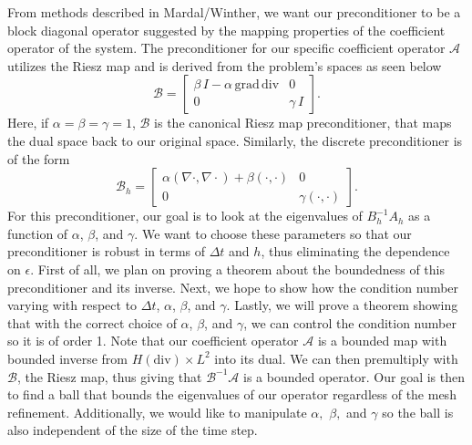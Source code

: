 \documentclass[11pt]{article}
\newcommand{\divv}{\mathrm{div}}
\newcommand{\gradd}{\mathrm{grad}}
\begin{document}
From methods described in Mardal/Winther, we want our preconditioner to be a block diagonal operator suggested by the mapping properties of the coefficient operator of the system. The preconditioner for our specific coefficient operator $\mathscr{A}$ utilizes the Riesz map and is derived from the problem's spaces as seen below
\begin{equation}
\mathscr{B}=\begin{bmatrix}
 \beta\, I -\alpha\,\gradd\,\divv& 0 \\
0 & \gamma\, I
\end{bmatrix}.
\end{equation}
Here, if $\alpha = \beta = \gamma = 1$, $\mathscr{B}$ is the canonical Riesz map preconditioner, that maps the dual space back to our original space. %
Similarly, the discrete preconditioner is of the form
\begin{equation}
\mathscr{B}_h=\begin{bmatrix}
\alpha(\nabla \cdot, \nabla \cdot) + \beta(\cdot,\cdot) & 0 \\
0 & \gamma(\cdot, \cdot)
\end{bmatrix}.
\end{equation}
For this preconditioner, our goal is to look at the eigenvalues of $B_h^{-1}A_h$ as a function of $\alpha$, $\beta$, and $\gamma$. We want to choose these parameters so that our preconditioner is robust in terms of $\Delta t$ and $h$, thus eliminating the dependence on $\epsilon$. First of all, we plan on proving a theorem about the boundedness of this preconditioner and its inverse. Next, we hope to show how the condition number varying with respect to $\Delta t$, $\alpha$, $\beta$, and $\gamma$. Lastly, we will prove a theorem showing that with the correct choice of $\alpha$, $\beta$, and $\gamma$, we can control the condition number so it is of order 1.
Note that our coefficient operator $\mathscr{A}$  is a bounded map with bounded inverse from $H(\divv) \times L^2$ into its dual. We can then premultiply with $\mathscr{B}$, the Riesz map, thus giving  that $\mathscr{B}^{-1}\mathscr{A}$ is a bounded operator. Our goal is then to find a ball that bounds the eigenvalues of our operator regardless of the mesh refinement. Additionally, we would like to manipulate $\alpha,$ $\beta,$ and $\gamma$ so the ball is also independent of the size of the time step.
\end{document}
